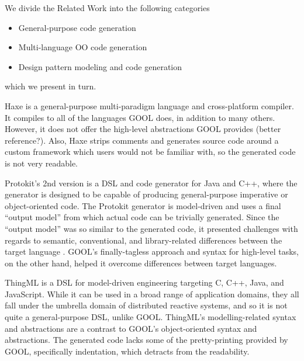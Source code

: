 \documentclass[sigplan,review,anonymous]{acmart}
\begin{document}
We divide the Related Work into the following categories
\begin{itemize}
\item General-purpose code generation
\item Multi-language OO code generation
\item Design pattern modeling and code generation
\end{itemize}
which we present in turn.

Haxe is a general-purpose multi-paradigm language and cross-platform compiler. 
It compiles to all of the languages GOOL does, in addition to many others. 
However, it does not offer the high-level abstractions GOOL provides 
\cite{Haxe} (better reference?). Also, Haxe strips comments and generates 
source code around a custom framework which users would not be familiar with, 
so the generated code is not very readable.

Protokit's 2nd version is a DSL and code generator for Java and C++, where the 
generator is designed to be capable of producing general-purpose imperative or 
object-oriented code. The Protokit generator is model-driven and uses a final 
``output model'' from which actual code can be trivially generated. Since the 
``output model'' was so similar to the generated code, it presented challenges 
with regards to semantic, conventional, and library-related differences between 
the target language \cite{kovesdan2017multi}. GOOL's finally-tagless approach 
and syntax for high-level tasks, on the other hand, helped it overcome 
differences between target languages.

ThingML \cite{harrand2016thingml} is a DSL for model-driven engineering 
targeting C, C++, Java, and JavaScript. While it can be used in a broad range 
of application domains, they all fall under the umbrella domain of distributed 
reactive systems, and so it is not quite a general-purpose DSL, unlike GOOL. 
ThingML's modelling-related syntax and abstractions are a contrast to GOOL's 
object-oriented syntax and abstractions. The generated code lacks some of the 
pretty-printing provided by GOOL, specifically indentation, which detracts from 
the readability.
\end{document}
